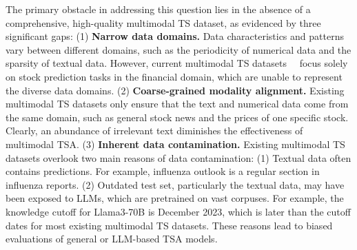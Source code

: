 The primary obstacle in addressing this question lies in the absence of a comprehensive, high-quality multimodal TS dataset, as evidenced by three significant gaps: (1) \textbf{Narrow data domains.} Data characteristics and patterns vary between different domains, such as the periodicity of numerical data and the sparsity of textual data. However,  current multimodal TS datasets~~\cite{dong2024fnspid,finance2,finance3,finance4,cao2023tempo} focus solely on stock prediction tasks in the financial domain, which are unable to represent the diverse data domains. (2) \textbf{Coarse-grained modality alignment.} Existing multimodal TS datasets only ensure that the text and numerical data come from the same domain, such as general stock news and the prices of one specific stock. Clearly, an abundance of irrelevant text diminishes the effectiveness of multimodal TSA. (3) \textbf{Inherent data contamination.} Existing multimodal TS datasets overlook two main reasons of data contamination: (1) Textual data often contains predictions. For example, influenza outlook is a regular section in influenza reports. (2) Outdated test set, particularly the textual data, may have been exposed to LLMs, which are pretrained on vast corpuses. For example, the knowledge cutoff for Llama3-70B is December 2023, which is later than the cutoff dates for most existing multimodal TS datasets. These reasons lead to biased evaluations of general or LLM-based TSA models.


